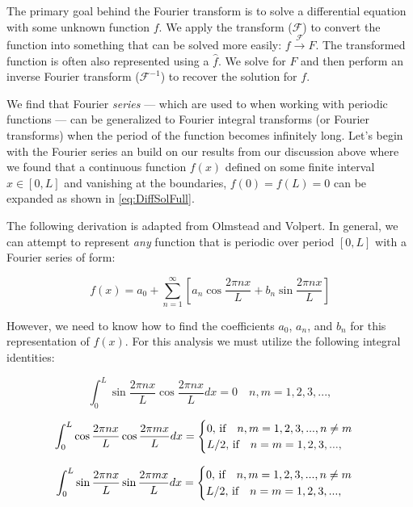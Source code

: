 		The primary goal behind the Fourier transform is to solve a differential equation with some unknown function $f$. We apply the transform ($\mathscr{F}$) to convert the function into something that can be solved more easily: $f \xrightarrow{\mathscr{F}} F$. The transformed function is often also represented using a $\hat{f}$. We solve for $F$ and then perform an inverse Fourier transform ($\mathscr{F}^{-1}$) to recover the solution for $f$.
		
		We find that Fourier \textit{series} --- which are used to when working with periodic functions --- can be generalized to Fourier integral transforms (or Fourier transforms) when the period of the function becomes infinitely long. Let's begin with the Fourier series an build on our results from our discussion above where we found that a continuous function $f(x)$ defined on some finite interval $x \in[0,L]$ and vanishing at the boundaries, $f(0) = f(L) = 0$ can be expanded as shown in \ref{eq:DiffSolFull}. 
		
		The following derivation is adapted from Olmstead and Volpert. In general, we can attempt to represent \textit{any} function that is periodic over period $[0,L]$ with a Fourier series of form:

\begin{equation}
f(x) = a_0 + \sum_{n=1}^\infty\left[a_n \cos{\frac{2 \pi n x}{L}} + b_n \sin{\frac{2 \pi n x}{L}}\right]
\label{eq:GenSol}
\end{equation}
		
However, we need to know how to find the coefficients $a_0$, $a_n$, and $b_n$ for this representation of $f(x)$. For this analysis we must utilize the following integral identities:

%
\begin{equation}
\int_0^L{\sin{\frac{2 \pi n x}{L}}\cos{\frac{2 \pi n x}{L}}}dx= 0 \quad n,m = 1,2,3,...,
\end{equation}

\begin{equation}
\int_0^L{\cos{\frac{2 \pi n x}{L}}\cos{\frac{2 \pi m x}{L}}} dx= 
	\begin{cases}
		0, \text{\,if} \quad n,m = 1,2,3,..., n\neq m\\
		L/2, \text{\,if} \quad n = m = 1,2,3,...,\\
	\end{cases}
\end{equation}

\begin{equation}
\int_0^L{\sin{\frac{2 \pi n x}{L}}\sin{\frac{2 \pi m x}{L}}} dx = 
	\begin{cases}
		0, \text{\,if} \quad  n,m = 1,2,3,..., n\neq m\\
		L/2, \text{\,if} \quad n = m = 1,2,3,...,\\
	\end{cases}
\end{equation}

